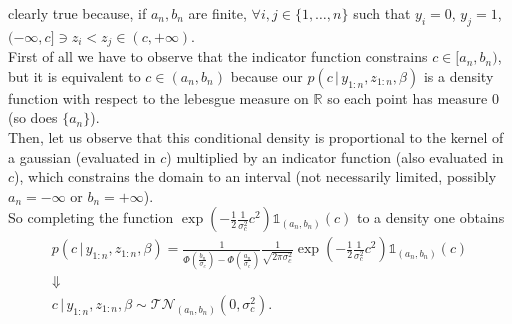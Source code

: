 \documentclass[
  11pt,
]{article}
\begin{document}
clearly true because, if \(a_n, b_n\) are finite,
\(\forall i, j \in \{1, \dots, n\}\) such that \(y_i = 0\), \(y_j = 1\),
\((-\infty, c] \ni z_i < z_j \in (c, +\infty)\).\\
First of all we have to observe that the indicator function constrains
\(c \in [a_n, b_n)\), but it is equivalent to \(c \in (a_n, b_n)\)
because our \(p(c \,|\,y_{1:n}, z_{1:n}, \beta)\) is a density function
with respect to the lebesgue measure on \(\mathbb{R}\) so each point has
measure \(0\) (so does \(\{a_n\}\)).\\
Then, let us observe that this conditional density is proportional to
the kernel of a gaussian (evaluated in \(c\)) multiplied by an indicator
function (also evaluated in \(c\)), which constrains the domain to an
interval (not necessarily limited, possibly \(a_n = -\infty\) or
\(b_n = + \infty\)).\\
So completing the function
\(\operatorname{exp}\left(-\frac{1}{2} \frac{1}{\sigma_c^2} c^2\right) \mathds{1}_{(a_n, b_n)}(c)\)
to a density one obtains \begin{gather*}
        p(c \,|\,y_{1:n}, z_{1:n}, \beta) = \frac{1}{\displaystyle \Phi\left(\frac{b_n}{\sigma_c}\right) - \Phi\left(\frac{a_n}{\sigma_c}\right)} \frac{1}{\sqrt{2 \pi \sigma_c^2}} \operatorname{exp}\left(-\frac{1}{2} \frac{1}{\sigma_c^2} c^2\right) \mathds{1}_{(a_n, b_n)}(c) \\
        \Downarrow \\
        c \,|\,y_{1:n}, z_{1:n}, \beta \sim \mathcal{T}\mathcal{N}_{(a_n, b_n)}\left(0,\sigma_c^2\right).
    \end{gather*}

\smallskip
\end{document}
